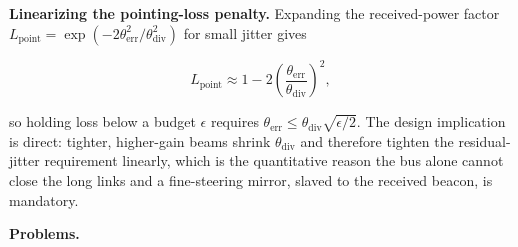 \documentclass[
  11pt,
  openany,
  oneside]{book}
\begin{document}
\textbf{Linearizing the pointing-loss penalty.} Expanding the
received-power factor
\(L_{\mathrm{point}} = \exp(-2\theta_{\mathrm{err}}^2/\theta_{\mathrm{div}}^2)\)
for small jitter gives

\begin{equation}
L_{\mathrm{point}} \approx 1 - 2\left(\frac{\theta_{\mathrm{err}}}{\theta_{\mathrm{div}}}\right)^2, \tag{13.5}
\end{equation}

so holding loss below a budget \(\epsilon\) requires
\(\theta_{\mathrm{err}} \le \theta_{\mathrm{div}}\sqrt{\epsilon/2}\).
The design implication is direct: tighter, higher-gain beams shrink
\(\theta_{\mathrm{div}}\) and therefore tighten the residual-jitter
requirement linearly, which is the quantitative reason the bus alone
cannot close the long links and a fine-steering mirror, slaved to the
received beacon, is mandatory.

\textbf{Problems.}
\end{document}
